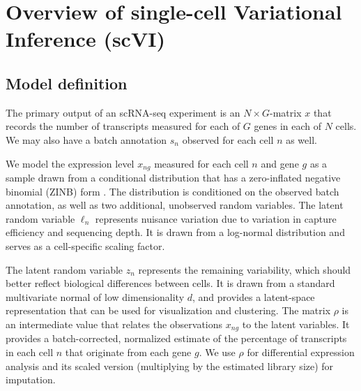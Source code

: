 \section{Overview of single-cell Variational Inference (scVI)}
\subsection{Model definition}

The primary output of an scRNA-seq experiment is an $N \times G$-matrix $x$ that records the number of transcripts measured for each of $G$ genes in each of $N$ cells. We may also have a batch annotation $s_n$ observed for each cell $n$ as well.

We model the  expression level $x_{ng}$ measured for each cell $n$ and gene $g$ as a sample drawn from a conditional distribution that has a zero-inflated negative binomial (ZINB) form \cite{Grun2014,deseq2,zinbwave}. The distribution is conditioned on the observed batch annotation, as well as  two additional, unobserved random variables. The latent random variable $\ell_n$ represents nuisance variation due to variation in capture efficiency and sequencing depth. It is drawn from a log-normal distribution and serves as a cell-specific scaling factor. %

The latent random variable $z_n$ represents the remaining variability, which should better reflect biological differences between cells. It is drawn from a standard multivariate normal of low dimensionality $d$, and provides a latent-space representation that can be used for visualization and clustering.
The matrix $\rho$ is an intermediate value that relates the observations $x_{ng}$ to the latent variables. It provides a batch-corrected, normalized estimate of the percentage of transcripts in each cell $n$ that originate from each gene $g$. We use $\rho$ for differential expression analysis and its scaled version (multiplying by the estimated library size) for imputation.


